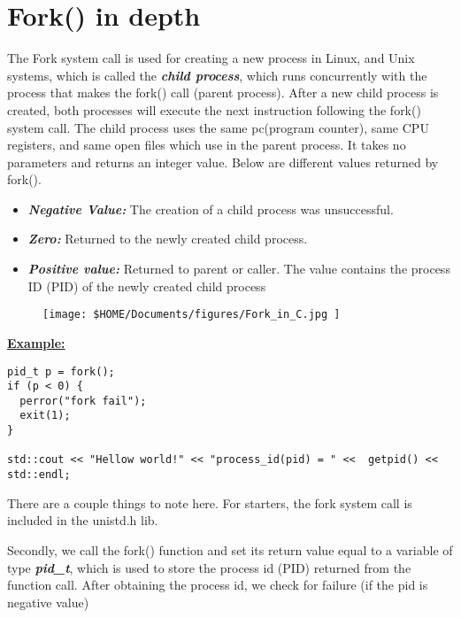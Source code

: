\documentclass{report}
\begin{document}
\section{Fork() in depth}
The Fork system call is used for creating a new process in Linux, and Unix systems, which is called the \textit{\textbf{child process}}, which runs concurrently with the process that makes the fork() call (parent process). After a new child process is created, both processes will execute the next instruction following the fork() system call.
\bigbreak \noindent
The child process uses the same pc(program counter), same CPU registers, and same open files which use in the parent process. It takes no parameters and returns an integer value.
\bigbreak \noindent
Below are different values returned by fork().
\begin{itemize}
  \item \textit{\textbf{Negative Value:}} The creation of a child process was unsuccessful.
  \item \textit{\textbf{Zero:}} Returned to the newly created child process.
  \item \textit{\textbf{Positive value:}} Returned to parent or caller. The value contains the process ID (PID) of the newly created child process
\end{itemize}

\begin{figure}[ht]
\centering
\texttt{[image:  \$HOME/Documents/figures/Fork\_in\_C.jpg ]}
\end{figure}
\bigbreak \noindent
\textbf{\underline{Example:}}
\begin{verbatim}
pid_t p = fork();
if (p < 0) {
  perror("fork fail");
  exit(1);
}

std::cout << "Hellow world!" << "process_id(pid) = " <<  getpid() << std::endl;
\end{verbatim}
There are a couple things to note here. For starters, the fork system call is included in the unistd.h lib.\vspace{1.5mm}

\noindent Secondly, we call the fork() function and set its return value equal to a variable of type \textit{\textbf{pid\_t}}, which is used to store the process id (PID) returned from the function call. \vspace{1.5mm}
\noindent 
After obtaining the process id, we check for failure (if the pid is negative value) \vspace{1.5mm}
\end{document}
